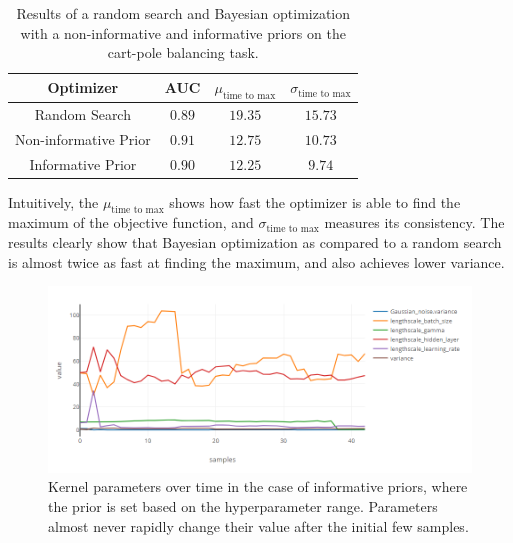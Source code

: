\begin{table}[t]
	\begin{center}
		\begin{tabular}{||c c c c||} 
			\hline
			Optimizer & AUC & $\mu_{\text{time to max}}$ & $\sigma_{\text{time to max}}$ \\ [0.5ex] 
			\hline\hline
			Random Search & $0.89$ & $19.35$ & $15.73$ \\ 
			\hline
			Non-informative Prior & $0.91$ & $12.75$ & $10.73$ \\
			\hline
			Informative Prior & $0.90$ & $12.25$ & $9.74$  \\
			\hline
		\end{tabular}
		\caption{Results of a random search and Bayesian optimization with a non-informative and informative priors on the cart-pole balancing task.}
		\label{table:reinforce-results}
	\end{center}
\end{table}

Intuitively, the $\mu_{\text{time to max}}$ shows how fast the optimizer is able to find the maximum of the objective function, and $\sigma_{\text{time to max}}$ measures its consistency. The results clearly show that Bayesian optimization as compared to a random search is almost twice as fast at finding the maximum, and also achieves lower variance.

\begin{figure}
	\begin{center}
		\includegraphics[width=1.0\textwidth]{images/informative-priors.png}
		\caption{Kernel parameters over time in the case of informative priors, where the prior is set based on the hyperparameter range. Parameters almost never rapidly change their value after the initial few samples.}
		\label{figure:informative-priors}
	\end{center}
\end{figure}

